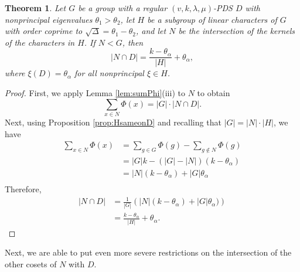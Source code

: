 \documentclass[12pt]{amsproc} %
\newtheorem{thm}{Theorem}[section]
\theoremstyle{definition}\newtheorem{defn}[thm]{Definition}
\theoremstyle{definition}\newtheorem{rem}[thm]{Remark}
\theoremstyle{definition}\newtheorem{ex}[thm]{Example}
\begin{document}
\begin{thm}\label{thm:G'capD}
        Let $G$ be a group with a regular $(v, k, \lambda, \mu)$-PDS $D$ with nonprincipal eigenvalues $\theta_1 > \theta_2$, let $H$ be a subgroup of linear characters of $G$ with order coprime to $\sqrt{\Delta} = \theta_1 - \theta_2$, and let $N$ be the intersection of the kernels of the characters in $H$.  If $N < G$, then
		\[ |N \cap D| = \frac{k - \theta_\alpha}{|H|} + \theta_\alpha,\]
		where $\xi(D) = \theta_\alpha$ for all nonprincipal $\xi \in H$.
\end{thm}
        \begin{proof}
 		First, we apply Lemma \ref{lem:sumPhi}(iii) to $N$ to obtain
 			\[ \sum_{x \in N} \Phi(x) = |G| \cdot |N \cap D|.\]
 		Next, using Proposition \ref{prop:HsameonD} and recalling that $|G| = |N|\cdot|H|$, we have
 			\begin{align*}
				 \sum_{x \in N} \Phi(x) &= \sum_{g \in G} \Phi(g) - \sum_{g \notin N} \Phi(g)\\
                        		 &= |G|k - \left(|G| - |N|\right)(k - \theta_\alpha)\\
                        		 &= |N|(k - \theta_\alpha) + |G|\theta_\alpha \\
 			 \end{align*}
		Therefore,
			\begin{align*}
 				|N \cap D| &= \frac{1}{|G|}\left( |N|(k - \theta_\alpha) + |G|\theta_\alpha) \right)\\
              			&= \frac{k - \theta_\alpha}{|H|} + \theta_\alpha.
			\end{align*}
	\end{proof}

Next, we are able to put even more severe restrictions on the intersection of the other cosets of $N$ with $D$.
\end{document}
